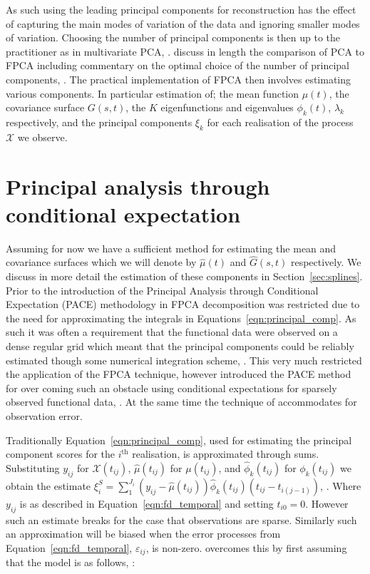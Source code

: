 As such using the leading principal components for reconstruction has the effect of capturing the main modes of variation of the data and ignoring smaller modes of variation.
Choosing the number of principal components is then up to the practitioner as in multivariate PCA, \citep{wold_principal_1987}.
 \citeauthor{ramsay_functional_2010} discuss in length the comparison of PCA to FPCA including commentary on the optimal choice of the number of principal components, \cite[Chapter~8]{ramsay_functional_2010}.
 The practical implementation of FPCA then involves estimating various components.
 In particular estimation of;  the mean function $\mu(t)$, the covariance surface $G\left(s,t \right)$, the $K$ eigenfunctions and eigenvalues $\phi_k(t)$, $\lambda_k$ respectively, and the principal components $\xi_k$ for each realisation of the process $\mathcal{X}$ we observe.

\section{Principal analysis through conditional expectation \label{sec:pace}}
Assuming for now we have a sufficient method for estimating the mean  and covariance surfaces which we will denote by $\hat{\mu}(t)$ and $\hat{G}\left(s, t \right)$ respectively.
We discuss in more detail the estimation of these components in Section~\ref{sec:splines}.
Prior to the introduction of the Principal Analysis through Conditional Expectation (PACE) methodology in \citep{yao_functional_2005} FPCA decomposition was restricted due to the need for approximating the integrals in Equations~\eqref{eqn:principal_comp}.
As such it was often a requirement that the functional data were observed on a dense regular grid which meant that the principal components could be reliably estimated though some numerical integration scheme, \citep[Chapter~8]{ramsay_functional_2010}.
This very much restricted the application of the FPCA technique, however \citeauthor{yao_functional_2005} introduced the PACE method for over coming such an obstacle using conditional expectations for sparsely observed functional data, \citep{yao_functional_2005}.
At the same time the technique of \citep{yao_functional_2005} accommodates for observation error. 

Traditionally Equation~\eqref{eqn:principal_comp}, used for estimating the principal component scores for the $i^\text{th}$ realisation, is approximated through sums.
Substituting $y_{ij}$ for $\mathcal{X}(t_{ij})$, $\hat{\mu}(t_{ij})$ for $\mu(t_{ij})$, and $\hat{\phi}_k(t_{ij})$ for  $\phi_k(t_{ij})$ we obtain the estimate $\xi_i^{S} = \sum_1^{J_i}\left(y_{ij} - \hat{\mu}(t_{ij})\right)\hat{\phi}_k(t_{ij})\left(t_{ij} - t_{i(j-1)}\right)$, \citep{yao_functional_2005}.
Where $y_{ij}$ is as described in Equation~\eqref{eqn:fd_temporal} and setting $t_{i0}=0$.
However such an estimate breaks for the case that observations are sparse. Similarly such an approximation will be biased when the error processes from Equation~\eqref{eqn:fd_temporal}, $\varepsilon_{ij}$, is non-zero.
\citeauthor{yao_functional_2005} overcomes this by first assuming that the model is as follows, \citep{yao_functional_2005}:

